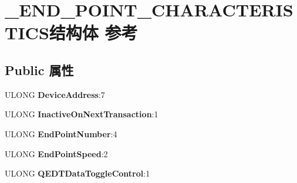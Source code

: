 \hypertarget{struct___e_n_d___p_o_i_n_t___c_h_a_r_a_c_t_e_r_i_s_t_i_c_s}{}\section{\+\_\+\+E\+N\+D\+\_\+\+P\+O\+I\+N\+T\+\_\+\+C\+H\+A\+R\+A\+C\+T\+E\+R\+I\+S\+T\+I\+C\+S结构体 参考}
\label{struct___e_n_d___p_o_i_n_t___c_h_a_r_a_c_t_e_r_i_s_t_i_c_s}
\subsection*{Public 属性}
\begin{DoxyCompactItemize}
\item 
\mbox{\label{struct___e_n_d___p_o_i_n_t___c_h_a_r_a_c_t_e_r_i_s_t_i_c_s_a842685e9cc07602aca1ac5c0d2d2e8d3}} 
U\+L\+O\+NG {\bfseries Device\+Address}\+:7
\item 
\mbox{\label{struct___e_n_d___p_o_i_n_t___c_h_a_r_a_c_t_e_r_i_s_t_i_c_s_a2a96bbe9762b7327c1bf5ff1b1e1b697}} 
U\+L\+O\+NG {\bfseries Inactive\+On\+Next\+Transaction}\+:1
\item 
\mbox{\label{struct___e_n_d___p_o_i_n_t___c_h_a_r_a_c_t_e_r_i_s_t_i_c_s_ad43dd21301fa0d5983733fb4014c5daf}} 
U\+L\+O\+NG {\bfseries End\+Point\+Number}\+:4
\item 
\mbox{\label{struct___e_n_d___p_o_i_n_t___c_h_a_r_a_c_t_e_r_i_s_t_i_c_s_ad9f7f9c43ce4618f5d97a1cd90bff2e3}} 
U\+L\+O\+NG {\bfseries End\+Point\+Speed}\+:2
\item 
\mbox{\label{struct___e_n_d___p_o_i_n_t___c_h_a_r_a_c_t_e_r_i_s_t_i_c_s_a69ec39d8bcf5f1f377809a0700045f84}} 
U\+L\+O\+NG {\bfseries Q\+E\+D\+T\+Data\+Toggle\+Control}\+:1
\item 
\mbox{\label{struct___e_n_d___p_o_i_n_t___c_h_a_r_a_c_t_e_r_i_s_t_i_c_s_a2cc606ed456fd25af870cdd396ead47e}} 

\end{DoxyCompactItemize}
